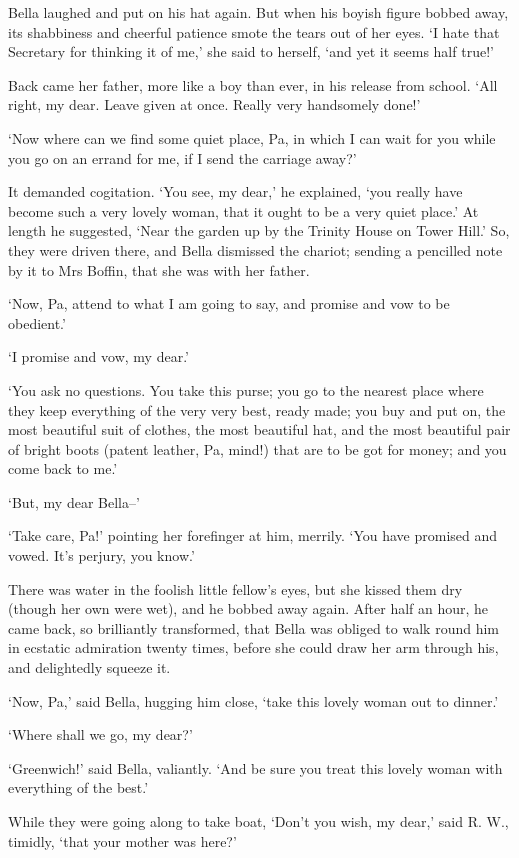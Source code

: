 Bella laughed and put on his hat again. But when his boyish figure
bobbed away, its shabbiness and cheerful patience smote the tears out
of her eyes. ‘I hate that Secretary for thinking it of me,’ she said to
herself, ‘and yet it seems half true!’

Back came her father, more like a boy than ever, in his release from
school. ‘All right, my dear. Leave given at once. Really very handsomely
done!’

‘Now where can we find some quiet place, Pa, in which I can wait for you
while you go on an errand for me, if I send the carriage away?’

It demanded cogitation. ‘You see, my dear,’ he explained, ‘you really
have become such a very lovely woman, that it ought to be a very quiet
place.’ At length he suggested, ‘Near the garden up by the Trinity House
on Tower Hill.’ So, they were driven there, and Bella dismissed the
chariot; sending a pencilled note by it to Mrs Boffin, that she was with
her father.

‘Now, Pa, attend to what I am going to say, and promise and vow to be
obedient.’

‘I promise and vow, my dear.’

‘You ask no questions. You take this purse; you go to the nearest place
where they keep everything of the very very best, ready made; you buy
and put on, the most beautiful suit of clothes, the most beautiful hat,
and the most beautiful pair of bright boots (patent leather, Pa, mind!)
that are to be got for money; and you come back to me.’

‘But, my dear Bella--’

‘Take care, Pa!’ pointing her forefinger at him, merrily. ‘You have
promised and vowed. It’s perjury, you know.’

There was water in the foolish little fellow’s eyes, but she kissed them
dry (though her own were wet), and he bobbed away again. After half an
hour, he came back, so brilliantly transformed, that Bella was obliged
to walk round him in ecstatic admiration twenty times, before she could
draw her arm through his, and delightedly squeeze it.

‘Now, Pa,’ said Bella, hugging him close, ‘take this lovely woman out to
dinner.’

‘Where shall we go, my dear?’

‘Greenwich!’ said Bella, valiantly. ‘And be sure you treat this lovely
woman with everything of the best.’

While they were going along to take boat, ‘Don’t you wish, my dear,’
said R. W., timidly, ‘that your mother was here?’

